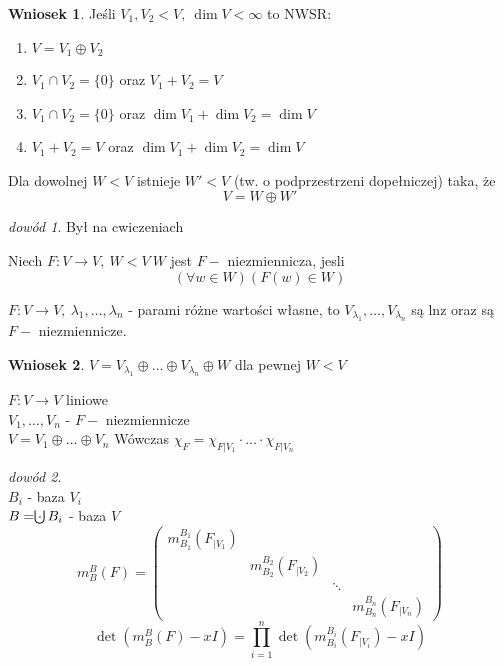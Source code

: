 \documentclass[10pt]{article}
\theoremstyle{definition}
\theoremstyle{definition}
\theoremstyle{definition}
\theoremstyle{definition}
\theoremstyle{remark}
\newtheorem*{dd}{dowód}
\theoremstyle{definition}
\theoremstyle{definition}
\newtheorem*{wn}{Wniosek}
\theoremstyle{definition}
\theoremstyle{definition}
\theoremstyle{definition}
\begin{document}
\begin{wn} 
    Jeśli $V_1,V_2 < V, \ \dim V < \infty$ to NWSR:
    \begin{enumerate}[(1)]
        \item $V = V_1 \oplus V_2$
        \item $V_1 \cap V_2 = \{ 0\}$ oraz $V_1 + V_2 = V$
        \item $V_1 \cap V_2 = \{ 0\}$ oraz $\dim V_1 + \dim V_2 = \dim V$ 
        \item $V_1 + V_2 = V$ oraz $\dim V_1 + \dim V_2 = \dim V$
    \end{enumerate} 
\end{wn}
\begin{lem} 
    Dla dowolnej $W < V$ istnieje $W' < V$ (tw. o podprzestrzeni dopełniczej) taka, że \[V = W \oplus W'\]
    \begin{dd} Był na cwiczeniach \end{dd} 
\end{lem} 
\begin{df} 
    Niech $F: V \to V,\ W < V \ W$ jest $F-$ niezmiennicza, jesli \[ (\forall w \in W) (F(w) \in W)\]
\end{df}
\begin{ft} 
    $F: V \to V,\ \lambda_1,\ldots,\lambda_n$ - parami różne wartości własne, to $V_{\lambda_1},\ldots,
    V_{\lambda_n}$ są lnz oraz są $F-$ niezmiennicze.
\end{ft} 
\begin{wn} 
    $V = V_{\lambda_1} \oplus \ldots \oplus V_{\lambda_n} \oplus W$ dla pewnej $W < V$
\end{wn} 
\begin{ft} 
    $F: V \to V$ liniowe \\ 
    $V_1,\ldots,V_n$ - $F-$ niezmiennicze \\ 
    $V = V_1 \oplus \ldots \oplus V_n$ 
    Wówczas $\chi_F = \chi_{F|{V_1}} \cdot \ldots \cdot \chi_{F|V_n}$
\end{ft} 
\begin{dd} ~\\ 
    $B_i$ - baza $V_i$ \\ 
    $B = \cdot \hspace{-7.5pt}\bigcup B_i$ - baza $V$ %
    \[ m_B^B (F) = 
        \begin{pmatrix} 
            m_{B_1}^{B_1} (F_{|V_1}) & & &  \\ 
                                     &  m_{B_2}^{B_2} (F_{|V_2}) & & \\ 
                                     & & \ddots & \\ 
                                     & & &   m_{B_n}^{B_n} (F_{|V_n}) 
        \end{pmatrix} 
    \]
    \[ \det (m_B^B (F) - xI) = \prod_{i=1}^n \det (m_{B_i}^{B_i} (F_{|V_i}) -xI)\]
\end{dd} 
\end{document}
